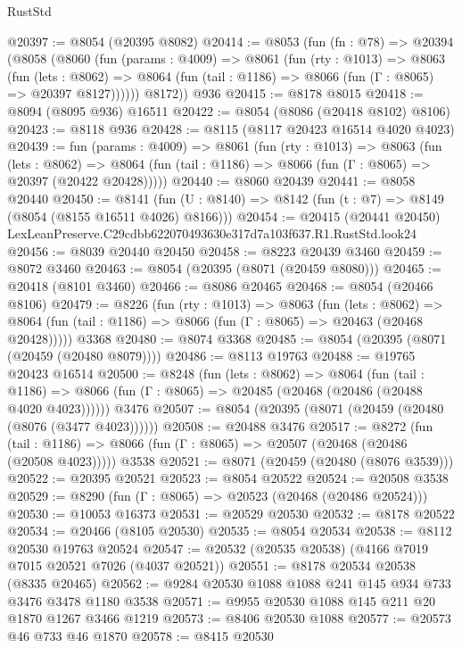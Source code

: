 \begin{lexlean}{RustStd}
\begin{coremodule}
@20397 := @8054 (@20395 @8082)
@20414 := @8053
    (fun (fn : @78) =>
    @20394
      (@8058
        (@8060
          (fun (params : @4009) =>
          @8061
            (fun (rty : @1013) =>
            @8063
              (fun (lets : @8062) =>
              @8064 (fun (tail : @1186) => @8066 (fun (Γ : @8065) => @20397 @8127))))))
        @8172))
    @936
@20415 := @8178 @8015
@20418 := @8094 (@8095 @936) @16511
@20422 := @8054 (@8086 (@20418 @8102) @8106)
@20423 := @8118 @936
@20428 := @8115 (@8117 @20423 @16514 @4020 @4023)
@20439 := fun (params : @4009) =>
  @8061
    (fun (rty : @1013) =>
    @8063
      (fun (lets : @8062) =>
      @8064 (fun (tail : @1186) => @8066 (fun (Γ : @8065) => @20397 (@20422 @20428)))))
@20440 := @8060 @20439
@20441 := @8058 @20440
@20450 := @8141
    (fun (U : @8140) => @8142 (fun (t : @7) => @8149 (@8054 (@8155 @16511 @4026) @8166)))
@20454 := @20415 (@20441 @20450) LexLeanPreserve.C29cdbb622070493630e317d7a103f637.R1.RustStd.look24
@20456 := @8039 @20440 @20450
@20458 := @8223 @20439 @3460
@20459 := @8072 @3460
@20463 := @8054 (@20395 (@8071 (@20459 @8080)))
@20465 := @20418 (@8101 @3460)
@20466 := @8086 @20465
@20468 := @8054 (@20466 @8106)
@20479 := @8226
    (fun (rty : @1013) =>
    @8063
      (fun (lets : @8062) =>
      @8064 (fun (tail : @1186) => @8066 (fun (Γ : @8065) => @20463 (@20468 @20428)))))
    @3368
@20480 := @8074 @3368
@20485 := @8054 (@20395 (@8071 (@20459 (@20480 @8079))))
@20486 := @8113 @19763
@20488 := @19765 @20423 @16514
@20500 := @8248
    (fun (lets : @8062) =>
    @8064
      (fun (tail : @1186) =>
      @8066 (fun (Γ : @8065) => @20485 (@20468 (@20486 (@20488 @4020 @4023))))))
    @3476
@20507 := @8054 (@20395 (@8071 (@20459 (@20480 (@8076 (@3477 @4023))))))
@20508 := @20488 @3476
@20517 := @8272
    (fun (tail : @1186) => @8066 (fun (Γ : @8065) => @20507 (@20468 (@20486 (@20508 @4023)))))
    @3538
@20521 := @8071 (@20459 (@20480 (@8076 @3539)))
@20522 := @20395 @20521
@20523 := @8054 @20522
@20524 := @20508 @3538
@20529 := @8290 (fun (Γ : @8065) => @20523 (@20468 (@20486 @20524)))
@20530 := @10053 @16373
@20531 := @20529 @20530
@20532 := @8178 @20522
@20534 := @20466 (@8105 @20530)
@20535 := @8054 @20534
@20538 := @8112 @20530 @19763 @20524
@20547 := @20532 (@20535 @20538) (@4166 @7019 @7015 @20521 @7026 (@4037 @20521))
@20551 := @8178 @20534 @20538 (@8335 @20465)
@20562 := @9284 @20530 @1088 @1088 @241 @145 @934 @733 @3476 @3478 @1180 @3538
@20571 := @9955 @20530 @1088 @145 @211 @20 @1870 @1267 @3466 @1219
@20573 := @8406 @20530 @1088
@20577 := @20573 @46 @733 @46 @1870
@20578 := @8415 @20530

\end{coremodule}
\end{lexlean}
